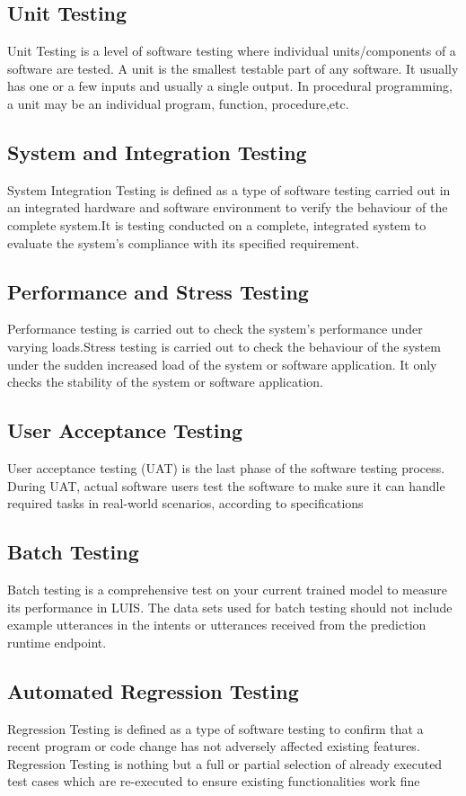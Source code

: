 \subsection{Unit Testing}
Unit Testing is a level of software testing where individual units/components of a software are tested. A unit is the smallest testable part of any software. It usually has one or a few inputs and usually a single output. In procedural programming, a unit may be an individual program, function, procedure,etc.

\subsection{System and Integration Testing}
System Integration Testing is defined as a type of software testing carried out in an integrated hardware and software environment to verify the behaviour of the complete system.It is testing conducted on a complete, integrated system to evaluate the system's compliance with its specified requirement.
\subsection{Performance and Stress Testing}
Performance testing is carried out to check the system's performance under varying loads.Stress testing is carried out to check the behaviour of the system under the sudden increased load of the system or software application. It only checks the stability of the system or software application.
\subsection{User Acceptance Testing}
User acceptance testing (UAT) is the last phase of the software testing process. During UAT, actual software users test the software to make sure it can handle required tasks in real-world scenarios, according to specifications
\subsection{Batch Testing}
Batch testing is a comprehensive test on your current trained model to measure its performance in LUIS. The data sets used for batch testing should not include example utterances in the intents or utterances received from the prediction runtime endpoint.\subsection{Automated Regression Testing}
Regression Testing is defined as a type of software testing to confirm that a recent program or code change has not adversely affected existing features. Regression Testing is nothing but a full or partial selection of already executed test cases which are re-executed to ensure existing functionalities work fine
